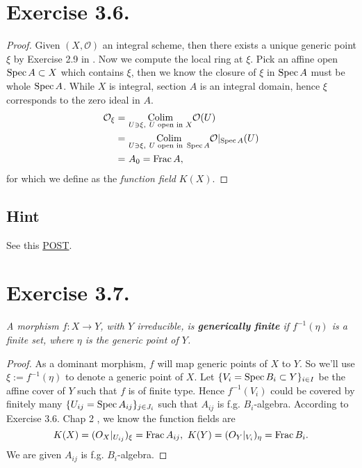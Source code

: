 \section{Exercise 3.6.}

\begin{proof}
Given $(X,\mathcal O)$ an integral scheme, then there exists a unique generic point $\xi$ by Exercise 2.9 in . Now we compute the local ring at $\xi$. Pick an affine open $\operatorname{Spec} A\subset X$ which contains $\xi$, then we know the closure of $\xi$ in $\operatorname{Spec} A$ must be whole $\operatorname{Spec} A$. While $X$ is integral, section $A$ is an integral domain, hence $\xi$ corresponds to the zero ideal in $A$.
\begin{align*}
    \mathcal O_{\xi} =&~ \underset{U \ni \xi,~ U \text{ open in } X}{\operatorname{Colim}} \mathcal O(U)\\
    =&~ \underset{U \ni \xi,~ U \text{ open in } \operatorname{Spec} A}{\operatorname{Colim}} \mathcal O\vert_{\operatorname{Spec} A}(U)\\ 
    =&~ A_{0}=\operatorname{Frac} A,
\end{align*} for which we define as the \textit{function field} $K(X)$.

\end{proof}

\subsection{Hint}

See this \href{https://math.stackexchange.com/questions/218767/relation-of-function-field-of-a-scheme-to-the-local-ring-of-its-prime-divisor}{POST}.

\section{Exercise 3.7.}

\textit{A morphism $f:X\to Y$, with $Y$ irreducible, is \textbf{generically finite } if $f^{-1}(\eta)$ is a finite set, where $\eta$ is the generic point of $Y$.}

\begin{proof}
    
    As a dominant morphism, $f$ will map generic points of $X$ to $Y$. So we'll use $\xi:=f^{-1}(\eta)$ to denote a generic point of $X$. Let $\{V_i=\operatorname{Spec} B_i\subset Y\}_{i\in I}$ be the affine cover of  $Y$ such that $f$ is of finite type. Hence $f^{-1}(V_i)$ could be covered by finitely many $\{U_{ij}=\operatorname{Spec} A_{ij}\}_{j\in J_i}$ such that $A_{ij}$ is f.g. $B_i$-algebra. According to Exercise 3.6. Chap 2 \cite{hartshorne2013algebraic}, we know the function fields are 
    \[K(X)=\mathcal (O_X\vert_{U_{ij}})_{\xi}=\operatorname{Frac} A_{ij},~ K(Y)=\mathcal (O_Y\vert_{V_i})_{\eta}=\operatorname{Frac} B_i.\]
    We are given $A_{ij}$ is f.g. $B_i$-algebra. 

\end{proof}

